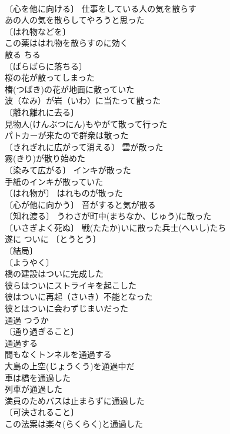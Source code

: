 \documentclass[8pt]{extreport}
\begin{document}
\begin{CJK}{UTF8}{min}
\\	〔心を他に向ける〕 仕事をしている人の気を散らす 
\\	あの人の気を散らしてやろうと思った 
\\	〔はれ物などを〕
\\	この薬ははれ物を散らすのに効く 
\\	散る	ちる	
\\	〔ばらばらに落ちる〕
\\	桜の花が散ってしまった 
\\	椿(つばき)の花が地面に散っていた 
\\	波（なみ）が岩（いわ）に当たって散った 
\\	〔離れ離れに去る〕
\\	見物人(けんぶつにん)もやがて散って行った 
\\	パトカーが来たので群衆は散った 
\\	〔きれぎれに広がって消える〕 雲が散った 
\\	霧(きり)が散り始めた 
\\	〔染みて広がる〕 インキが散った 
\\	手紙のインキが散っていた 
\\	〔はれ物が〕 はれものが散った 
\\	〔心が他に向かう〕 音がすると気が散る 
\\	〔知れ渡る〕 うわさが町中(まちなか、じゅう)に散った 
\\	〔いさぎよく死ぬ〕 戦(たたか)いに散った兵士(へいし)たち 
\\	遂に	ついに	〔とうとう〕
\\	〔結局〕
\\	〔ようやく〕
\\	橋の建設はついに完成した 
\\	彼らはついにストライキを起こした 
\\	彼はついに再起（さいき）不能となった 
\\	彼とはついに会わずじまいだった 
\\	通過	つうか	
\\	〔通り過ぎること〕
\\	通過する 
\\	間もなくトンネルを通過する 
\\	大島の上空(じょうくう)を通過中だ 
\\	車は橋を通過した 
\\	列車が通過した 
\\	満員のためバスは止まらずに通過した 
\\	〔可決されること〕
\\	この法案は楽々(らくらく)と通過した 

\end{CJK}
\end{document}
